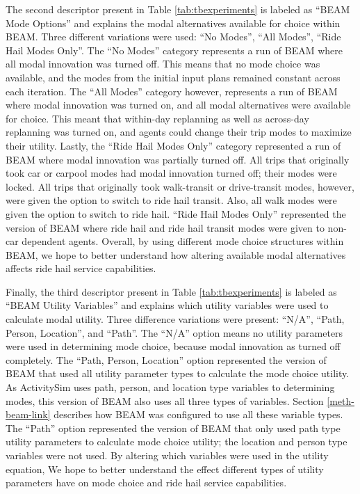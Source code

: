 \documentclass[12pt, oneside, openright]{byuthesis}
\begin{document}
The second descriptor present in Table \ref{tab:tbexperiments} is labeled as ``BEAM Mode Options'' and explains the modal alternatives available for choice within BEAM. Three different variations were used: ``No Modes'', ``All Modes'', ``Ride Hail Modes Only''. The ``No Modes'' category represents a run of BEAM where all modal innovation was turned off. This means that no mode choice was available, and the modes from the initial input plans remained constant across each iteration. The ``All Modes'' category however, represents a run of BEAM where modal innovation was turned on, and all modal alternatives were available for choice. This meant that within-day replanning as well as across-day replanning was turned on, and agents could change their trip modes to maximize their utility. Lastly, the ``Ride Hail Modes Only'' category represented a run of BEAM where modal innovation was partially turned off. All trips that originally took car or carpool modes had modal innovation turned off; their modes were locked. All trips that originally took walk-transit or drive-transit modes, however, were given the option to switch to ride hail transit. Also, all walk modes were given the option to switch to ride hail. ``Ride Hail Modes Only'' represented the version of BEAM where ride hail and ride hail transit modes were given to non-car dependent agents. Overall, by using different mode choice structures within BEAM, we hope to better understand how altering available modal alternatives affects ride hail service capabilities.

Finally, the third descriptor present in Table \ref{tab:tbexperiments} is labeled as ``BEAM Utility Variables'' and explains which utility variables were used to calculate modal utility. Three difference variations were present: ``N/A'', ``Path, Person, Location'', and ``Path''. The ``N/A'' option means no utility parameters were used in determining mode choice, because modal innovation as turned off completely. The ``Path, Person, Location'' option represented the version of BEAM that used all utility parameter types to calculate the mode choice utility. As ActivitySim uses path, person, and location type variables to determining modes, this version of BEAM also uses all three types of variables. Section \ref{meth-beam-link} describes how BEAM was configured to use all these variable types. The ``Path'' option represented the version of BEAM that only used path type utility parameters to calculate mode choice utility; the location and person type variables were not used. By altering which variables were used in the utility equation, We hope to better understand the effect different types of utility parameters have on mode choice and ride hail service capabilities.
\end{document}
